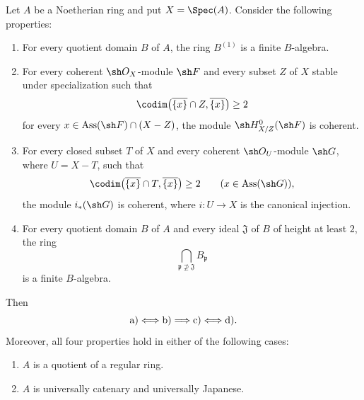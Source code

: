 \begin{corollary}[5.11.6]
\label{IV.5.11.6}
Let $A$ be a Noetherian ring and put $X=\Spec(A)$.  Consider the
following properties:
\begin{enumerate}[{\rm a)}]
  \item For every quotient domain $B$ of $A$, the ring $B^{(1)}$
   is a finite $B$-algebra.
  \item For every coherent $\sh O_X$-module $\sh F$ and every
  subset $Z$ of $X$ stable under specialization such that
  \[
    \codim\bigl(\overline{\{x\}}\cap Z,\overline{\{x\}}\bigr)
    \geq2
  \]
  for every
  $x\in\operatorname{Ass}(\sh F)\cap(X-Z)$, the module
  $\sh H^0_{X/Z}(\sh F)$ is coherent.
  \item For every closed subset $T$ of $X$ and every coherent
  $\sh O_U$-module $\sh G$, where $U=X-T$, such that
  \[
    \codim\bigl(\overline{\{x\}}\cap T,\overline{\{x\}}\bigr)
    \geq2
    \qquad
    (x\in\operatorname{Ass}(\sh G)),
  \]
  the module $i_*(\sh G)$ is coherent, where $i:U\to X$ is the
  canonical injection.
  \item For every quotient domain $B$ of $A$ and every ideal
  $\mathfrak J$ of $B$ of height at least $2$, the ring
  \[
    \bigcap_{\mathfrak p\not\supseteq\mathfrak J}
      B_{\mathfrak p}
  \]
  is a finite $B$-algebra.
\end{enumerate}
Then
\[
  {\rm a)}\Longleftrightarrow{\rm b)}
  \Longrightarrow{\rm c)}
  \Longleftrightarrow{\rm d)}.
\]
Moreover, all four properties hold in either of the following
cases:
\begin{enumerate}[{\rm(i)}]
  \item $A$ is a quotient of a regular ring.
  \item $A$ is universally catenary and universally Japanese.
\end{enumerate}
\end{corollary}

